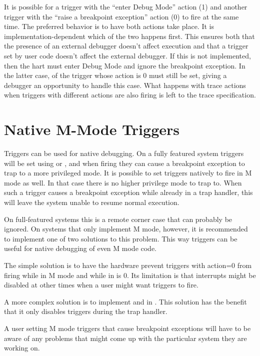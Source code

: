 It is possible for a trigger with the ``enter Debug Mode'' action (1) and another
trigger with the ``raise a breakpoint exception'' action (0) to fire at the same
time. The preferred behavior is to have both actions take place.  It is
implementation-dependent which of the two happens first.  This ensures both
that the presence of an external debugger doesn't affect execution and that a
trigger set by user code doesn't affect the external debugger. If this is not
implemented, then the hart must enter Debug Mode and ignore the breakpoint
exception. In the latter case, \Fhit of the trigger whose action is 0 must still
be set, giving a debugger an opportunity to handle this case. What happens with
trace actions when triggers with different actions are also firing is left to
the trace specification.

\section{Native M-Mode Triggers}
\label{sec:mmtrigger}

Triggers can be used for native debugging. On a fully featured system triggers
will be set using \Fu or \Fs, and when firing they can cause a breakpoint exception
to trap to a more privileged mode. It is possible to set triggers natively to
fire in M mode as well. In that case there is no higher privilege mode to trap
to. When such a trigger causes a breakpoint exception while already in a trap
handler, this will leave the system unable to resume normal execution.

On full-featured systems this is a remote corner case that can probably be
ignored. On systems that only implement M mode, however, it is recommended to
implement one of two solutions to this problem. This way triggers can be useful
for native debugging of even M mode code.

The simple solution is to have the hardware prevent triggers with action=0 from
firing while in M mode and while \Fmie in \Rmstatus is 0. Its limitation is
that interrupts might be disabled at other times when a user might want
triggers to fire.

A more complex solution is to implement \Fmte and \Fmpte in \Rtcontrol. This
solution has the benefit that it only disables triggers during the trap
handler.

A user setting M mode triggers that cause breakpoint exceptions will have to be
aware of any problems that might come up with the particular system they are
working on.

